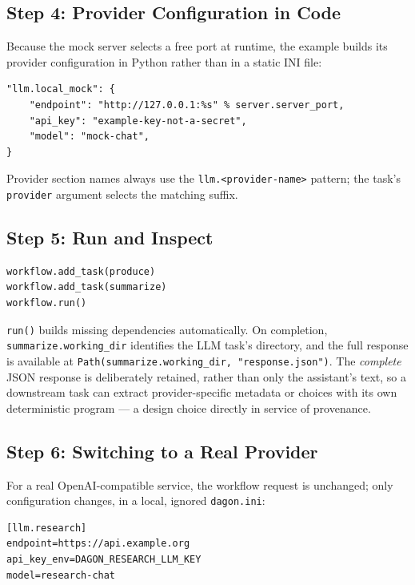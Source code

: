 \subsection{Step 4: Provider Configuration in Code}

Because the mock server selects a free port at runtime, the example builds
its provider configuration in Python rather than in a static INI file:

\begin{lstlisting}
"llm.local_mock": {
    "endpoint": "http://127.0.0.1:%s" % server.server_port,
    "api_key": "example-key-not-a-secret",
    "model": "mock-chat",
}
\end{lstlisting}

Provider section names always use the \texttt{llm.<provider-name>} pattern;
the task's \texttt{provider} argument selects the matching suffix.

\subsection{Step 5: Run and Inspect}

\begin{lstlisting}
workflow.add_task(produce)
workflow.add_task(summarize)
workflow.run()
\end{lstlisting}

\texttt{run()} builds missing dependencies automatically. On completion,
\texttt{summarize.working\_dir} identifies the LLM task's directory, and the
full response is available at \texttt{Path(summarize.working\_dir, "response.json")}.
The \emph{complete} JSON response is deliberately retained, rather than only
the assistant's text, so a downstream task can extract provider-specific
metadata or choices with its own deterministic program --- a design choice
directly in service of provenance.

\subsection{Step 6: Switching to a Real Provider}

For a real OpenAI-compatible service, the workflow request is unchanged; only
configuration changes, in a local, ignored \texttt{dagon.ini}:

\begin{lstlisting}[style=ini]
[llm.research]
endpoint=https://api.example.org
api_key_env=DAGON_RESEARCH_LLM_KEY
model=research-chat
\end{lstlisting}

